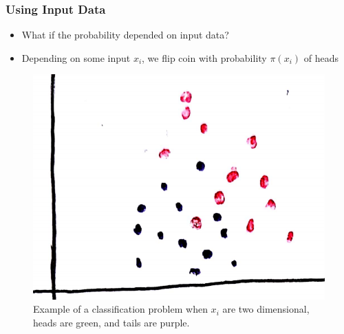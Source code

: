 \documentclass[10pt,mathserif]{beamer}
\begin{document}
\begin{frame}
  \frametitle{Using Input Data}
  \begin{itemize}
  \item What if the probability depended on input data?
  \item Depending on some input $x_i$, we flip coin with probability
    $\pi\left(x_i\right)$ of heads
  \end{itemize}
  \begin{figure}
    \centering
    \includegraphics[width=0.3\paperwidth]{figure/logistic_scatter}
    \caption{Example of a classification problem when $x_i$ are two dimensional,
      heads are green, and tails are purple. \label{fig:logistic_scatter} }
  \end{figure}
\end{frame}
\end{document}
